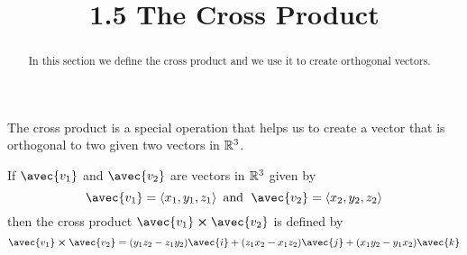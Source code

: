 \documentclass[handout]{ximera}
\title{1.5 The Cross Product}
\begin{document}
\begin{abstract}
In this section we define the cross product and we use it to create orthogonal vectors.
\end{abstract}
 
\maketitle
The cross product is a special operation that helps us to create a vector that is orthogonal to two given two vectors in $\mathbb R^3$.
\begin{definition}
If $\avec{v_1}$ and $\avec{v_2}$ are vectors in $\mathbb R^3$ given by
\[
\avec{v_1} = \vector{x_1, y_1, z_1} \text{  and   } \;\avec{v_2} = \vector{x_2, y_2, z_2}
\]
then the cross product $\avec{v_1} \cross \avec{v_2}$ is defined by
\[
\avec{v_1} \cross \avec{v_2} =  (y_1z_2 - z_1y_2) \avec{i} + (z_1x_2 - x_1z_2) \avec{j} + (x_1y_2 - y_1x_2) \avec{k} 
\]
\end{definition}
\end{document}
